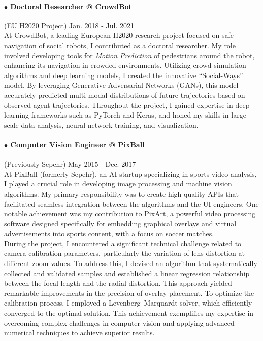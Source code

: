 \documentclass[10pt]{res}
\begin{document}
\begin{resume}
\paragraph{$\bullet$ Doctoral Researcher @ \href{http://crowdbot.eu} {CrowdBot}} (EU H2020 Project) \hfill Jan. 2018 - Jul. 2021\\
At CrowdBot, a leading European H2020 research project focused on safe navigation of social robots, I contributed as a doctoral researcher. My role involved developing tools for \textit{Motion Prediction} of pedestrians around the robot, enhancing its navigation in crowded environments. Utilizing crowd simulation algorithms and deep learning models, I created the innovative \enquote{Social-Ways} model. By leveraging Generative Adversarial Networks (GANs), this model accurately predicted multi-modal distributions of future trajectories based on observed agent trajectories. Throughout the project, I gained expertise in deep learning frameworks such as PyTorch and Keras, and honed my skills in large-scale data analysis, neural network training, and visualization.
\vspace{-8pt}

\paragraph{$\bullet$ Computer Vision Engineer @ \href{http://pixballsports.com}{PixBall}} (Previously Sepehr) \hfill May 2015 - Dec. 2017\\
At PixBall (formerly Sepehr), an AI startup specializing in sports video analysis, I played a crucial role in developing image processing and machine vision algorithms. My primary responsibility was to create high-quality APIs that facilitated seamless integration between the algorithms and the UI engineers. One notable achievement was my contribution to PixArt, a powerful video processing software designed specifically for embedding graphical overlays and virtual advertisements into sports content, with a focus on soccer matches.\\
During the project, I encountered a significant technical challenge related to camera calibration parameters, particularly the variation of lens distortion at different zoom values. To address this, I devised an algorithm that systematically collected and validated samples and established a linear regression relationship between the focal length and the radial distortion. This approach yielded remarkable improvements in the precision of overlay placement. To optimize the calibration process, I employed a Levenberg–Marquardt solver, which efficiently converged to the optimal solution. This achievement exemplifies my expertise in overcoming complex challenges in computer vision and applying advanced numerical techniques to achieve superior results.


\end{resume}
\end{document}
